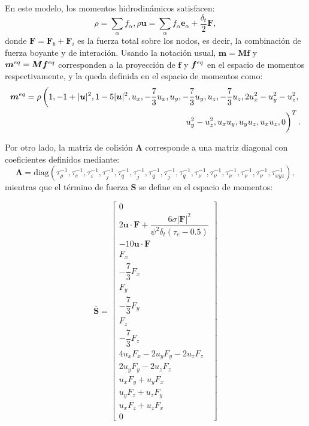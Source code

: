 En este modelo, los momentos hidrodin\'amicos satisfacen:
\begin{subequations}
	\begin{equation}
		\rho = \sum_{\alpha} f_{\alpha},
	\end{equation}
	\begin{equation}
		\rho \bm{u} = \sum_{\alpha} f_{\alpha} \bm{e}_{\alpha} + \dfrac{\delta_t}{2}\bm{F},
	\end{equation}
\end{subequations}
donde $\bm{F} = \bm{F}_b + \bm{F}_i$ es la fuerza total sobre los nodos, es decir, la combinaci\'on de fuerza boyante y de interaci\'on. Usando la notaci\'on usual, $\bm{m} = \bm{Mf}$ y $\bm{m}^{eq} = \bm{M}\bm{f}^{eq}$ corresponden a la proyecci\'on de $\bm{f}$ y $\bm{f}^{eq}$ en el espacio de momentos respectivamente, y la \edf{} queda definida en el espacio de momentos como:
\begin{equation}
	\begin{split}
		\feq{m} = \rho \left( 1, -1+|\bm{u}|^2, 1-5|\bm{u}|^2, u_x, -\dfrac{7}{3}u_x, u_y, -\dfrac{7}{3}u_y, u_z, -\dfrac{7}{3}u_z, 2u_x^2-u_y^2-u_z^2, \right.\\
		\left.\phantom{\dfrac{1}{1}} u_y^2 - u_z^2, u_xu_y, u_yu_z,u_xu_z,0 \right)^T	.
	\end{split}	
\end{equation}

Por otro lado, la matriz de colisi\'on $\bm{\Lambda}$ corresponde a una matriz diagonal con coeficientes definidos mediante:
\begin{equation}
	\bm{\Lambda} = \mbox{diag}(\tau_{\rho}^{-1}, \tau_{e}^{-1}, \tau_{\varepsilon}^{-1}, \tau_{j}^{-1}, \tau_{q}^{-1}, \tau_{j}^{-1}, \tau_{q}^{-1}, \tau_{j}^{-1}, \tau_{q}^{-1}, \tau_{\nu}^{-1}, \tau_{\nu}^{-1}, \tau_{\nu}^{-1}, \tau_{\nu}^{-1}, \tau_{\nu}^{-1}, \tau_{xyz}^{-1}),
\end{equation}
mientras que el t\'ermino de fuerza $\bm{S}$ se define en el espacio de momentos:

\begin{equation}
 \bar{\bm{S}} = 
 \left[ 
 	\begin{array}{c} 
 		0	\\
 		2 \bm{u} \cdot \bm{F} + \dfrac{6\sigma |\bm{F}|^2}{\psi^2 \delta_t (\tau_e-0.5)} \\
 		-10 \bm{u} \cdot \bm{F} \\
 		F_x \\
 		-\dfrac{7}{3}F_x \\
 		F_y \\
 		-\dfrac{7}{3}F_y \\
 		F_z \\
 		-\dfrac{7}{3}F_z \\ 		
		4u_xF_x - 2u_yF_y - 2u_zF_z \\
		2u_yF_y - 2u_zF_z \\
		u_xF_y + u_yF_x \\
		u_yF_z + u_zF_y \\
		u_xF_z + u_zF_x \\
		0
 	\end{array} 
 \right]
 \label{eq:s_xu}
\end{equation}
\FloatBarrier

